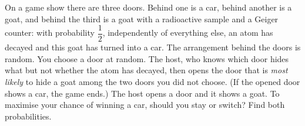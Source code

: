 On a game show there are three doors. Behind one is a car, behind another is a goat, and behind the third is a goat with a radioactive sample and a Geiger counter: with probability $\dfrac{1}{2}$, independently of everything else, an atom has decayed and this goat has turned into a car. The arrangement behind the doors is random. You choose a door at random. The host, who knows which door hides what but not whether the atom has decayed, then opens the door that is \emph{most likely} to hide a goat among the two doors you did not choose. (If the opened door shows a car, the game ends.) The host opens a door and it shows a goat. To maximise your chance of winning a car, should you stay or switch? Find both probabilities.
